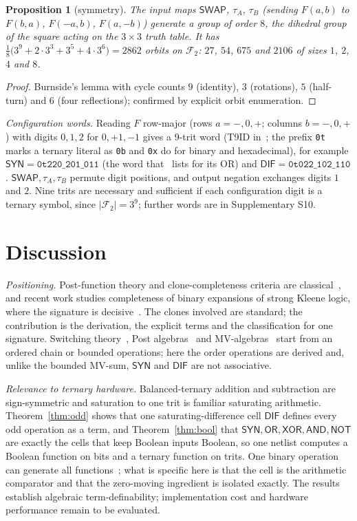 \documentclass[conference]{IEEEtran}
\newcommand{\SYN}{\mathsf{SYN}}
\newcommand{\DIF}{\mathsf{DIF}}
\newcommand{\OR}{\mathsf{OR}}
\newcommand{\XOR}{\mathsf{XOR}}
\newcommand{\AND}{\mathsf{AND}}
\newcommand{\NOT}{\mathsf{NOT}}
\newcommand{\SWAP}{\mathsf{SWAP}}
\newcommand{\Ftwo}{\mathcal F_2}
\newtheorem{proposition}{Proposition}
\theoremstyle{remark}
\begin{document}
	\begin{proposition}[symmetry]\label{prop:sym}
		The input maps $\SWAP$, $\tau_A$, $\tau_B$ (sending $F(a,b)$ to $F(b,a)$, $F(-a,b)$, $F(a,-b)$) generate a group of order $8$, the dihedral group of the square acting on the $3\times3$ truth table. It has $\tfrac18\big(3^9+2\cdot3^3+3^5+4\cdot3^6\big)=2862$ orbits on $\Ftwo$: $27$, $54$, $675$ and $2106$ of sizes $1$, $2$, $4$ and $8$.
	\end{proposition}
	\begin{proof}
		Burnside's lemma with cycle counts $9$ (identity), $3$ (rotations), $5$ (half-turn) and $6$ (four reflections); confirmed by explicit orbit enumeration.
	\end{proof}
	
	\emph{Configuration words.} Reading $F$ row-major (rows $a=-,0,+$; columns $b=-,0,+$) with digits $0,1,2$ for $0,+1,-1$ gives a 9-trit word (T9ID in~\cite{caiCN}; the prefix \texttt{0t} marks a ternary literal as \texttt{0b} and \texttt{0x} do for binary and hexadecimal), for example $\SYN=\texttt{0t220\_201\_011}$ (the word that~\cite{caiCN} lists for its OR) and $\DIF=\texttt{0t022\_102\_110}$. $\SWAP,\tau_A,\tau_B$ permute digit positions, and output negation exchanges digits $1$ and $2$. Nine trits are necessary and sufficient if each configuration digit is a ternary symbol, since $|\Ftwo|=3^9$; further words are in Supplementary S10.
	
	\section{Discussion}\label{sec:limits}
	\emph{Positioning.} Post-function theory and clone-completeness criteria are classical~\cite{post1921,webb1935,slupecki1939,rosenberg1970,lau2006}, and recent work studies completeness of binary expansions of strong Kleene logic, where the signature is decisive~\cite{roblesmendez2022}. The clones involved are standard; the contribution is the derivation, the explicit terms and the classification for one signature. Switching theory~\cite{miller2008,muzio1986}, Post algebras~\cite{rosenbloom1942} and MV-algebras~\cite{cignoli2000} start from an ordered chain or bounded operations; here the order operations are derived and, unlike the bounded MV-sum, $\SYN$ and $\DIF$ are not associative.
	
	\emph{Relevance to ternary hardware.} Balanced-ternary addition and subtraction are sign-symmetric and saturation to one trit is familiar saturating arithmetic. Theorem~\ref{thm:odd} shows that one saturating-difference cell $\DIF$ defines every odd operation as a term, and Theorem~\ref{thm:bool} that $\SYN,\OR,\XOR,\AND,\NOT$ are exactly the cells that keep Boolean inputs Boolean, so one netlist computes a Boolean function on bits and a ternary function on trits. One binary operation can generate all functions~\cite{webb1935}; what is specific here is that the cell is the arithmetic comparator and that the zero-moving ingredient is isolated exactly. The results establish algebraic term-definability; implementation cost and hardware performance remain to be evaluated.
	
\end{document}
